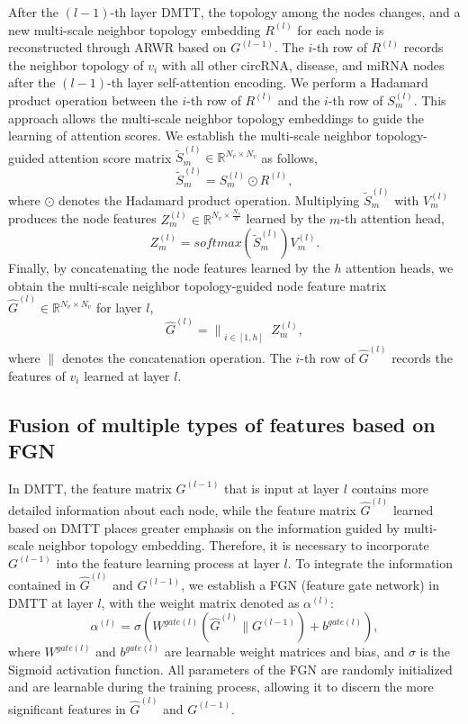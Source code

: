 \documentclass[journal=jcisd8,manuscript=article]{achemso}
\begin{document}
After the $(l-1)$-th layer DMTT, the topology among the nodes changes, and a new multi-scale neighbor topology embedding $R^{(l)}$ for each node is reconstructed through ARWR based on $G^{(l - 1)}$. The $i$-th row of $R^{(l)}$ records the neighbor topology of $v_i$ with all other circRNA, disease, and miRNA nodes after the $(l-1)$-th layer self-attention encoding. We perform a Hadamard product operation between the $i$-th row of $R^{(l)}$ and the $i$-th row of $S_{m}^{(l)}$. This approach allows the multi-scale neighbor topology embeddings to guide the learning of attention scores. We establish the multi-scale neighbor topology-guided attention score matrix $\widetilde{S}_{m}^{(l)} \in \mathbb{R}^{N_v \times N_v}$ as follows,
\begin{equation}
	\widetilde{S}_{m}^{(l)} = S_{m}^{(l)} \odot R^{(l)},
\end{equation}
where $\odot$ denotes the Hadamard product operation. Multiplying $\widetilde{S}_{m}^{(l)}$ with $V_{m}^{(l)}$ produces the node features ${Z_{m}^{(l)}} \in \mathbb{R}^{N_v \times \frac{N_v}{h}}$ learned by the $m$-th attention head,
\begin{equation}
	{Z_{m}^{(l)}} = softmax(\widetilde{S}_{m}^{(l)})V_{m}^{(l)}.
\end{equation}
Finally, by concatenating the node features learned by the $h$ attention heads, we obtain the multi-scale neighbor topology-guided node feature matrix $\hat{G}^{(l)} \in \mathbb{R}^{N_v \times N_v}$ for layer $l$,
\begin{equation}
	\hat{G}^{(l)}= \bigg\|_{\substack{i\in {[1,h]}}} Z^{(l)}_{m},
\end{equation}
where $\|$ denotes the concatenation operation. The $i$-th row of $\hat{G}^{(l)}$ records the features of $v_i$ learned at layer $l$.
\vspace{-0.5cm}

\subsection{Fusion of multiple types of features based on FGN}
\vspace{-0.3cm}
In DMTT, the feature matrix ${G}^{(l - 1)}$ that is input at layer $l$ contains more detailed information about each node, while the feature matrix $\hat{G}^{(l)}$ learned based on DMTT places greater emphasis on the information guided by multi-scale neighbor topology embedding. Therefore, it is necessary to incorporate ${G}^{(l - 1)}$ into the feature learning process at layer $l$. To integrate the information contained in $\hat{G}^{(l)}$ and $G^{(l - 1)}$, we establish a FGN (feature gate network) in DMTT at layer $l$, with the weight matrix denoted as $\alpha^{(l)}$:
\begin{equation}
    \alpha^{(l)} = \sigma (W^{gate(l)}(\hat{G}^{(l)}\| G^{(l - 1)}) + b^{gate(l)}),
\end{equation}
where $W^{gate(l)}$ and $b^{gate(l)}$ are learnable weight matrices and bias, and $\sigma$ is the Sigmoid activation function. All parameters of the FGN are randomly initialized and are learnable during the training process, allowing it to discern the more significant features in $\hat{G}^{(l)}$ and $G^{(l - 1)}$.
\end{document}
